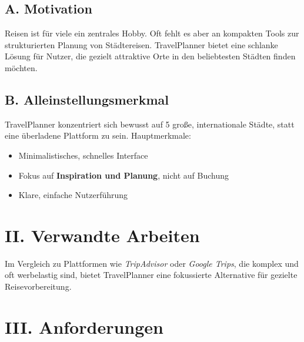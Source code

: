 \documentclass[a4paper,12pt]{article}
\begin{document}
    \subsection*{A. Motivation}
    Reisen ist für viele ein zentrales Hobby. Oft fehlt es aber an kompakten Tools zur strukturierten Planung von Städtereisen.
    TravelPlanner bietet eine schlanke Lösung für Nutzer, die gezielt attraktive Orte in den beliebtesten Städten finden möchten.

    \subsection*{B. Alleinstellungsmerkmal}
    TravelPlanner konzentriert sich bewusst auf 5 große, internationale Städte, statt eine überladene Plattform zu sein.
    Hauptmerkmale:
    \begin{itemize}
        \item Minimalistisches, schnelles Interface
        \item Fokus auf \textbf{Inspiration und Planung}, nicht auf Buchung
        \item Klare, einfache Nutzerführung
    \end{itemize}

    \section*{II. Verwandte Arbeiten}
    Im Vergleich zu Plattformen wie \textit{TripAdvisor} oder \textit{Google Trips}, die komplex und oft werbelastig sind, bietet TravelPlanner eine fokussierte Alternative für gezielte Reisevorbereitung.

    \section*{III. Anforderungen}
\end{document}
